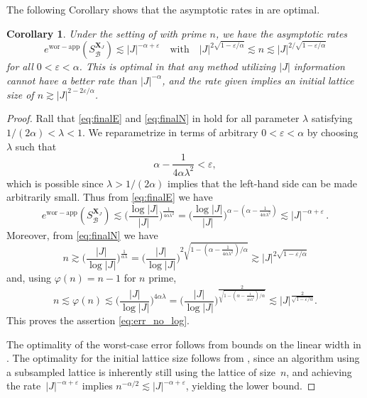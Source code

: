 \documentclass[a4paper]{amsart}
\newtheorem{corollary}[theorem]{Corollary}
\newcommand{\ewc}{e^{\mathrm{wor-app}}}
\begin{document}
The following Corollary shows that the asymptotic rates in  are optimal.

\begin{corollary}\label{cor} Under the setting of  with prime $n$, we have the asymptotic rates
    \begin{equation}
    \label{eq:err_no_log}
        \ewc(S_{\mathcal B}^{\bm X_J})
        \lesssim |J|^{-\alpha+\varepsilon}
        \quad\text{with}\quad
        |J|^{2\sqrt{1-\varepsilon/\alpha}}
        \lesssim
        n
        \lesssim
        |J|^{2/\sqrt{1-\varepsilon/\alpha}} \end{equation}
    for all $0<\varepsilon < \alpha$.
    This is optimal in that any method utilizing $|J|$ information cannot have a better rate than $|J|^{-\alpha}$, and the rate given implies an initial lattice size of $n\gtrsim |J|^{2-2\varepsilon/\alpha}$.
\end{corollary} 

\begin{proof} Rall that \eqref{eq:finalE} and \eqref{eq:finalN} in  hold for all parameter $\lambda$ satisfying $1/(2\alpha) < \lambda < 1$. We reparametrize in terms of arbitrary $0 <\varepsilon < \alpha$ by choosing $\lambda$ such that 
\[
  \alpha - \frac{1}{4\alpha\lambda^2} < \varepsilon,
\]
which is possible since $\lambda>1/(2\alpha)$ implies that the left-hand side can be made arbitrarily small. Thus from \eqref{eq:finalE} we have{}
\begin{equation*}
        \ewc(S_{\mathcal B}^{\bm X_J})
        \lesssim \Big(\frac{\log|J|}{|J|}\Big)^{\frac{1}{4\alpha\lambda^2}}
        = \Big(\frac{\log|J|}{|J|}\Big)^{\alpha - (\alpha-\frac{1}{4\alpha\lambda^2})}
        \lesssim|J|^{-\alpha+\varepsilon} \,.
    \end{equation*}
Moreover, from \eqref{eq:finalN} we have
    \begin{equation*}
        n \gtrsim \Big(\frac{|J|}{\log|J|}\Big)^{\frac{1}{\alpha\lambda}}
= \Big(\frac{|J|}{\log|J|}\Big)^{2\sqrt{1 - (\alpha-\frac{1}{4\alpha\lambda^2})/\alpha}}
         \gtrsim |J|^{2\sqrt{1-\varepsilon/\alpha}}
    \end{equation*}
    and, using $\varphi(n) = n -1$ for $n$ prime,
    \begin{equation*}
        n \lesssim \varphi(n) \lesssim \Big(\frac{|J|}{\log|J|}\Big)^{4\alpha\lambda}
= \Big(\frac{|J|}{\log|J|}\Big)^{\frac{2}{\sqrt{1-(\alpha-\frac{1}{4\alpha\lambda^2})/\alpha}}}
        \lesssim |J|^{\frac{2}{\sqrt{1-\varepsilon/\alpha}}}.
    \end{equation*}
    This proves the assertion \eqref{eq:err_no_log}.

    The optimality of the worst-case error follows from bounds on the linear width in \cite[Theorem~4.45]{DTU18}.
    The optimality for the initial lattice size follows from \cite{BKUV17}, since an algorithm using a subsampled lattice is inherently still using the lattice of size~$n$, and achieving the rate~$|J|^{-\alpha+\varepsilon}$ implies $n^{-\alpha/2} \lesssim |J|^{-\alpha+\varepsilon}$, yielding the lower bound.
\end{proof} 
\end{document}
